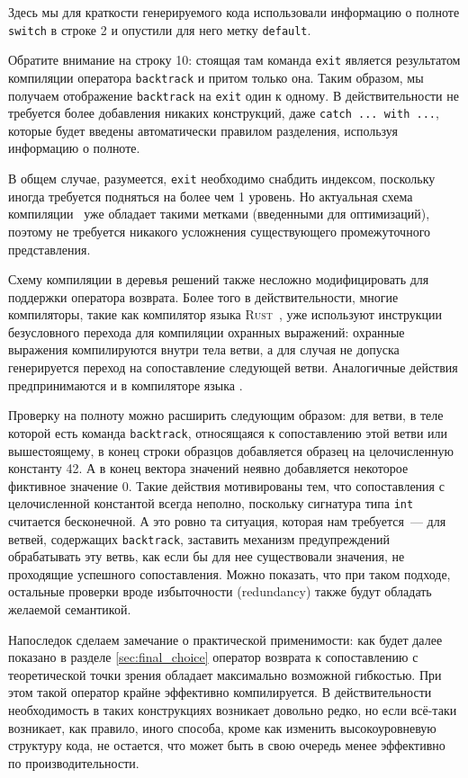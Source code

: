Здесь мы для краткости генерируемого кода использовали информацию о полноте \lstinline|switch| в строке 2 и опустили для него метку \lstinline|default|.

Обратите внимание на строку 10: стоящая там команда \lstinline|exit| является результатом компиляции оператора \lstinline|backtrack| и притом только она. Таким образом, мы получаем отображение \lstinline|backtrack| на \lstinline|exit| один к одному. В действительности не требуется более добавления никаких конструкций, даже \lstinline[language=none]|catch ... with ...|, которые будет введены автоматически правилом разделения, используя информацию о полноте.

В общем случае, разумеется, \lstinline|exit| необходимо снабдить индексом, поскольку иногда требуется подняться на более чем 1 уровень. Но актуальная схема компиляции~\cite{fessant2001optimizing} уже обладает такими метками (введенными для оптимизаций), поэтому не требуется никакого усложнения существующего промежуточного представления.

Схему компиляции в деревья решений также несложно модифицировать для поддержки оператора возврата. Более того в действительности, многие компиляторы, такие как компилятор языка \textsc{Rust}~\cite{rust_reference}, уже используют инструкции безусловного перехода для компиляции охранных выражений: охранные выражения компилируются внутри тела ветви, а для случая не допуска генерируется переход на сопоставление следующей ветви. Аналогичные действия предпринимаются и в компиляторе языка \ocaml.

Проверку на полноту можно расширить следующим образом: для ветви, в теле которой есть команда \lstinline|backtrack|, относящаяся к сопоставлению этой ветви или вышестоящему, в конец строки образцов добавляется образец на целочисленную константу 42. А в конец вектора значений неявно добавляется некоторое фиктивное значение 0. Такие действия мотивированы тем, что сопоставления с целочисленной константой всегда неполно, поскольку сигнатура типа \lstinline|int| считается бесконечной. А это ровно та ситуация, которая нам требуется~--- для ветвей, содержащих \lstinline|backtrack|, заставить механизм предупреждений~\cite{maranget2007warnings} обрабатывать эту ветвь, как если бы для нее существовали значения, не проходящие успешного сопоставления. Можно показать, что при таком подходе, остальные проверки вроде избыточности (redundancy) также будут обладать желаемой семантикой.

Напоследок сделаем замечание о практической применимости: как будет далее показано в разделе \ref{sec:final_choice} оператор возврата к сопоставлению с теоретической точки зрения обладает максимально возможной гибкостью. При этом такой оператор крайне эффективно компилируется. В действительности необходимость в таких конструкциях возникает довольно редко, но если всё-таки возникает, как правило, иного способа, кроме как изменить высокоуровневую структуру кода, не остается, что может быть в свою очередь менее эффективно по производительности.

